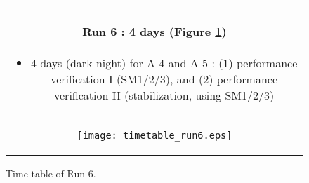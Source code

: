 \begin{figure}[!ht]
\begin{center}
\begin{tabular}{c}
\begin{minipage}{0.95\hsize}
\paragraph{Run 6 : 4 days  (Figure \ref{fig:run6})}
	\begin{itemize}
	\item 4 days (dark-night) for A-4 and A-5 : 
	(1) performance verification I (SM1/2/3),  and
	(2) performance verification II (stabilization, using SM1/2/3)
	\end{itemize}
\end{minipage} \\
\begin{minipage}{0.8\hsize}
	\begin{center}
	\vspace*{5mm}
	\texttt{[image: timetable\_run6.eps]}
	\end{center}
	\vspace*{-5mm}
	\caption{Time table of Run 6.}
	\label{fig:run6}
\end{minipage}
\end{tabular}
\end{center}
\end{figure}


